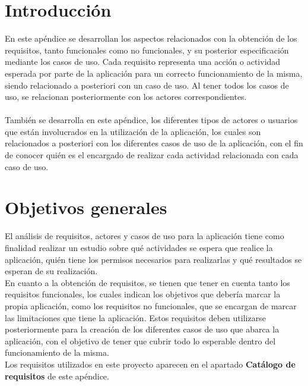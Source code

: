 
\section{Introducción}



	En este apéndice se desarrollan los aspectos relacionados con la obtención
	de los requisitos, tanto funcionales como no funcionales, y su posterior
	especificación mediante los casos de uso. Cada requisito representa una
	acción o actividad esperada por parte de la aplicación para un correcto
	funcionamiento de la misma, siendo relacionado a posteriori con un caso de
	uso. Al tener todos los casos de uso, se relacionan posteriormente con los
	actores correspondientes. \\\\
	También se desarrolla en este apéndice, los diferentes tipos de actores o
	usuarios que están involucrados en la utilización de la aplicación, los
	cuales son relacionados a posteriori con los diferentes casos de uso de la
	aplicación, con el fin de conocer quién es el encargado de realizar cada
	actividad relacionada con cada caso de uso.
	

\section{Objetivos generales}

El análisis de requisitos, actores y casos de uso para la aplicación tiene como
finalidad realizar un estudio sobre qué actividades se espera que realice la
aplicación, quién tiene los permisos necesarios para realizarlas y qué
resultados se esperan de su realización. 
\\
En cuanto a la obtención de requisitos, se tienen que tener en cuenta tanto los
	requisitos funcionales, los cuales indican los objetivos que debería marcar
	la propia aplicación, como los requisitos no funcionales, que se encargan de
	marcar las limitaciones que tiene la aplicación. Estos requisitos deben
	utilizarse posteriormente para la creación de los diferentes casos de uso
	que abarca la aplicación, con el objetivo de tener que cubrir todo lo
	esperable dentro del funcionamiento de la misma. \\
	Los requisitos utilizados en este proyecto aparecen en el apartado
	\textbf{Catálogo de requisitos} de este apéndice.

